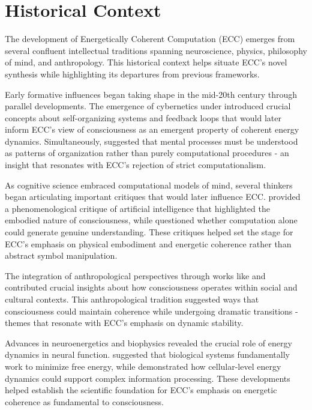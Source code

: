 \section{Historical Context}

The development of Energetically Coherent Computation (ECC) emerges from several confluent intellectual traditions spanning neuroscience, physics, philosophy of mind, and anthropology. This historical context helps situate ECC's novel synthesis while highlighting its departures from previous frameworks.

Early formative influences began taking shape in the mid-20th century through parallel developments. The emergence of cybernetics under \cite{wiener1948cybernetics} introduced crucial concepts about self-organizing systems and feedback loops that would later inform ECC's view of consciousness as an emergent property of coherent energy dynamics. Simultaneously, \cite{bateson1972steps} suggested that mental processes must be understood as patterns of organization rather than purely computational procedures - an insight that resonates with ECC's rejection of strict computationalism.

As cognitive science embraced computational models of mind, several thinkers began articulating important critiques that would later influence ECC. \cite{dreyfus1972computers} provided a phenomenological critique of artificial intelligence that highlighted the embodied nature of consciousness, while \cite{searle1980minds} questioned whether computation alone could generate genuine understanding. These critiques helped set the stage for ECC's emphasis on physical embodiment and energetic coherence rather than abstract symbol manipulation.

The integration of anthropological perspectives through works like \cite{rappaport1979ecology} and \cite{turner1967forest} contributed crucial insights about how consciousness operates within social and cultural contexts. This anthropological tradition suggested ways that consciousness could maintain coherence while undergoing dramatic transitions - themes that resonate with ECC's emphasis on dynamic stability.

Advances in neuroenergetics and biophysics revealed the crucial role of energy dynamics in neural function. \cite{friston2010free} suggested that biological systems fundamentally work to minimize free energy, while \cite{levin2019computational} demonstrated how cellular-level energy dynamics could support complex information processing. These developments helped establish the scientific foundation for ECC's emphasis on energetic coherence as fundamental to consciousness.

